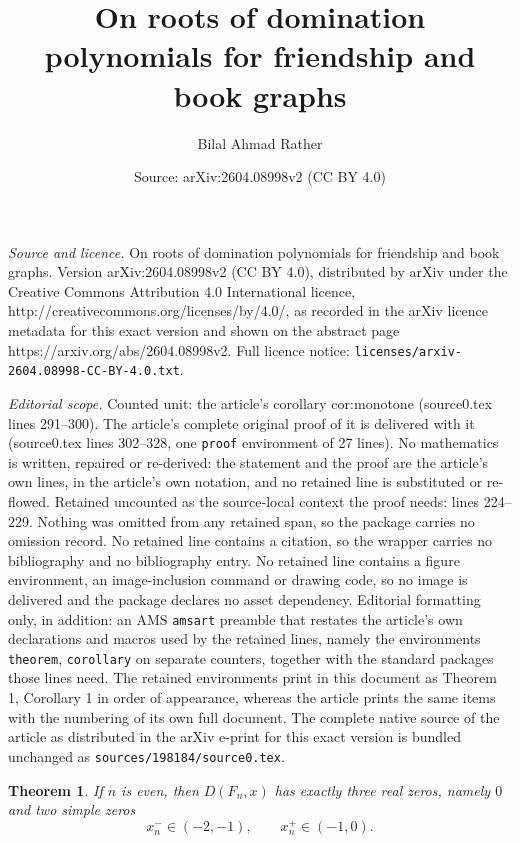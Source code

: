 \documentclass[10pt,a4paper]{amsart}
\title{On roots of domination polynomials for friendship and book graphs}
\author{Bilal Ahmad Rather}
\date{Source: arXiv:2604.08998v2 (CC BY 4.0)}
\newtheorem{theorem}{Theorem}
\begin{document}
\maketitle

\noindent\emph{Source and licence.} On roots of domination polynomials for friendship and book graphs. Version arXiv:2604.08998v2 (CC BY 4.0), distributed by arXiv under the Creative Commons Attribution 4.0 International licence, http://creativecommons.org/licenses/by/4.0/, as recorded in the arXiv licence metadata for this exact version and shown on the abstract page https://arxiv.org/abs/2604.08998v2. Full licence notice: \texttt{licenses/arxiv-2604.08998-CC-BY-4.0.txt}.\par\smallskip

\noindent\textit{Editorial scope.} Counted unit: the article's corollary cor:monotone (source0.tex lines 291--300). The article's complete original proof of it is delivered with it (source0.tex lines 302--328, one \texttt{proof} environment of 27 lines). No mathematics is written, repaired or re-derived: the statement and the proof are the article's own lines, in the article's own notation, and no retained line is substituted or re-flowed.  Retained uncounted as the source-local context the proof needs: lines 224--229.  Nothing was omitted from any retained span, so the package carries no omission record.  No retained line contains a citation, so the wrapper carries no bibliography and no bibliography entry.  No retained line contains a figure environment, an image-inclusion command or drawing code, so no image is delivered and the package declares no asset dependency.  Editorial formatting only, in addition: an AMS \texttt{amsart} preamble that restates the article's own declarations and macros used by the retained lines, namely the environments \texttt{theorem}, \texttt{corollary} on separate counters, together with the standard packages those lines need.  The retained environments print in this document as Theorem 1, Corollary 1 in order of appearance, whereas the article prints the same items with the numbering of its own full document.  The complete native source of the article as distributed in the arXiv e-print for this exact version is bundled unchanged as \texttt{sources/198184/source0.tex}.
	\begin{theorem} \label{thm:exactthree}
		If $n$ is even, then $D(F_n,x)$ has exactly three real zeros, namely $0$ and two simple zeros
		$$
		x_n^- \in (-2,-1), \qquad x_n^+ \in (-1,0).
		$$
	\end{theorem}
\end{document}
